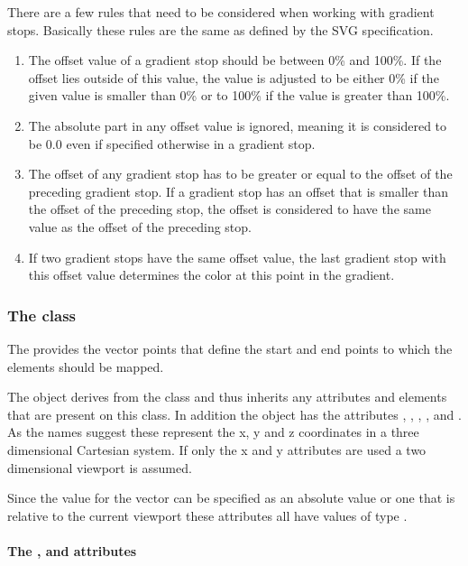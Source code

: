 There are a few rules that need to be considered when working with gradient stops.
Basically these rules are the same as defined by the SVG specification.

\begin{enumerate}
\item{The offset value of a gradient stop should be between 0\% and 100\%. If the offset lies outside of this value, the value is adjusted to be either 0\% if the given value is smaller than 0\% or to 100\% if the value is greater than 100\%.}
\item{The absolute part in any offset value is ignored, meaning it is considered to be 0.0 even if specified otherwise in a gradient stop.}
\item{The offset of any gradient stop has to be greater or equal to the offset of the preceding gradient stop. If a gradient stop has an offset that is smaller than the offset of the preceding stop, the offset is considered to have the same value as the offset of the preceding stop.}
\item{If two gradient stops have the same offset value, the last gradient stop with this offset value determines the color at this point in the gradient.}
\end{enumerate}
\subsubsection{The  class}
\label{lineargradient-class}

The \LinearGradient provides the vector points that define the start and end points to which the \GradientStop elements should be mapped.

The \LinearGradient object derives from the \GradientBase class and thus
inherits any attributes and elements that are present on this class.
In addition the \LinearGradient object has the attributes  , ,
, ,  and . As the names suggest these represent the x, y and z coordinates in a three dimensional Cartesian system. If only the x and y attributes are used a two dimensional viewport is assumed.

Since the value for the vector can be specified as an absolute value or one that is relative to the current viewport these attributes all have values of type \RelAbsVector.

\paragraph{The \fixttspace{}, \fixttspace{} and \fixttspace{} attributes}

